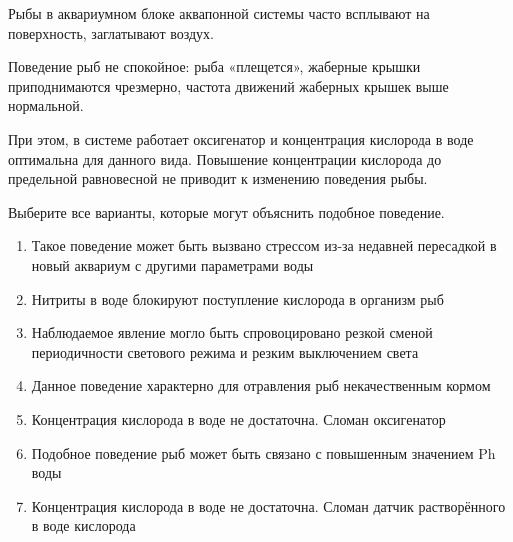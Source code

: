 
Рыбы в аквариумном блоке аквапонной системы часто всплывают на поверхность, заглатывают воздух.

Поведение рыб не спокойное: рыба «плещется», жаберные крышки приподнимаются чрезмерно, частота движений жаберных крышек выше нормальной.

При этом, в системе работает оксигенатор и концентрация кислорода в воде оптимальна для данного вида. Повышение концентрации кислорода до предельной равновесной не приводит к изменению поведения рыбы.

Выберите все варианты, которые могут объяснить подобное поведение.

\begin{enumerate}
    \item Такое поведение может быть вызвано стрессом из-за недавней пересадкой в новый аквариум с другими параметрами воды
    \item Нитриты в воде блокируют поступление кислорода в организм рыб
    \item Наблюдаемое явление могло быть спровоцировано резкой сменой периодичности светового режима и резким выключением света
    \item Данное поведение характерно для отравления рыб некачественным кормом
    \item Концентрация кислорода в воде не достаточна. Сломан оксигенатор
    \item Подобное поведение рыб может быть связано с повышенным значением Ph воды
    \item Концентрация кислорода в воде не достаточна. Сломан датчик растворённого в воде кислорода
\end{enumerate}


